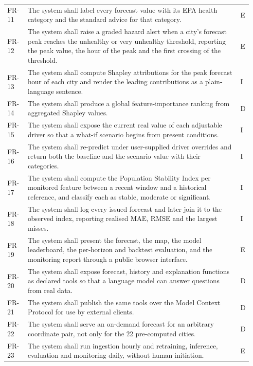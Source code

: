 \begin{xltabular}{\textwidth}{Q{1.5cm} Y Q{1.1cm}}
FR-11 & The system shall label every forecast value with its EPA health category
and the standard advice for that category. & E \\
FR-12 & The system shall raise a graded hazard alert when a city's forecast peak
reaches the unhealthy or very unhealthy threshold, reporting the peak value, the
hour of the peak and the first crossing of the threshold. & E \\
FR-13 & The system shall compute Shapley attributions for the peak forecast hour
of each city and render the leading contributions as a plain-language sentence. & I \\
FR-14 & The system shall produce a global feature-importance ranking from
aggregated Shapley values. & D \\
FR-15 & The system shall expose the current real value of each adjustable driver
so that a what-if scenario begins from present conditions. & I \\
FR-16 & The system shall re-predict under user-supplied driver overrides and
return both the baseline and the scenario value with their categories. & I \\
FR-17 & The system shall compute the Population Stability Index per monitored
feature between a recent window and a historical reference, and classify each as
stable, moderate or significant. & I \\
FR-18 & The system shall log every issued forecast and later join it to the
observed index, reporting realised MAE, RMSE and the largest misses. & I \\
FR-19 & The system shall present the forecast, the map, the model leaderboard,
the per-horizon and backtest evaluation, and the monitoring report through a
public browser interface. & E \\
FR-20 & The system shall expose forecast, history and explanation functions as
declared tools so that a language model can answer questions from real data. & D \\
FR-21 & The system shall publish the same tools over the Model Context Protocol
for use by external clients. & D \\
FR-22 & The system shall serve an on-demand forecast for an arbitrary coordinate
pair, not only for the 22 pre-computed cities. & D \\
FR-23 & The system shall run ingestion hourly and retraining, inference,
evaluation and monitoring daily, without human initiation. & E \\
\end{xltabular}

